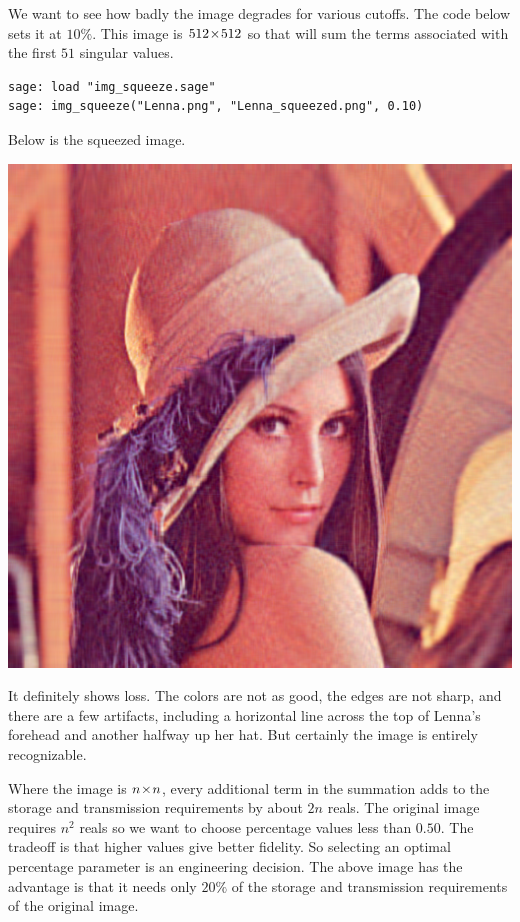 We want to see how badly the image degrades for various cutoffs.
The code below sets it at $10\%$.
This image is $512 \! \times \! 512$  so that will sum the terms associated
with the first $51$ singular 
values.
\begin{lstlisting}
sage: load "img_squeeze.sage"                                 
sage: img_squeeze("Lenna.png", "Lenna_squeezed.png", 0.10)
\end{lstlisting}
Below is the squeezed image.
\begin{center}
  \includegraphics[width=.95\textwidth]{Lenna_squeezed.png}
\end{center}
It definitely shows loss.
The colors are not as good, the edges are not sharp, and there are 
a few artifacts, including a horizontal line across the top of 
Lenna's forehead and another halfway up her hat.
But certainly the image is entirely recognizable.

Where the image is $n \! \times \! n$, every additional term in the summation
adds to the storage and transmission requirements by about $2n$ reals.
The original image requires $n^2$ reals so we want to choose percentage values 
less than $0.50$.
The tradeoff is that higher values give better fidelity.
So selecting an optimal percentage parameter is an engineering decision.
The above image has the advantage is that it needs only $20\%$ of the storage
and transmission requirements of the original image.
 
